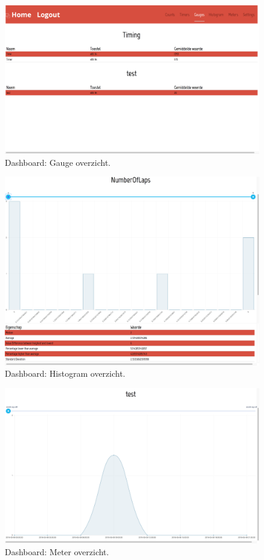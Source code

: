 \begin{figure}[!h]
  \centering
  \includegraphics[scale=0.2]{Afbeeldingen/Implementatie/Gauge}
  \caption{Dashboard: Gauge overzicht.}
  \label{fig:DasbhoardGauge}
\end{figure}

\begin{figure}[!h]
  \centering
  \includegraphics[scale=0.2]{Afbeeldingen/Implementatie/Histogram}
  \caption{Dashboard: Histogram overzicht.}
  \label{fig:DasbhoardHistogram}
\end{figure}

\begin{figure}[!h]
  \centering
  \includegraphics[scale=0.2]{Afbeeldingen/Implementatie/Meter}
  \caption{Dashboard: Meter overzicht.}
  \label{fig:DasbhoardMeter}
\end{figure}

